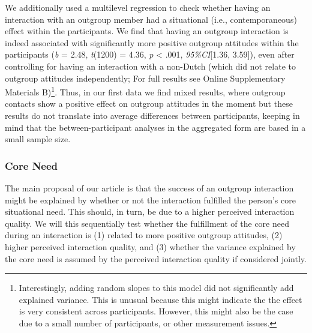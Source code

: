 We additionally used a multilevel regression to check whether having an
interaction with an outgroup member had a situational (i.e.,
contemporaneous) effect within the participants. We find that having an
outgroup interaction is indeed associated with significantly more
positive outgroup attitudes within the participants (\textit{b} = 2.48,
\textit{t}(1200) = 4.36, \textit{p} \textless{} .001,
\textit{95\%CI}{[}1.36, 3.59{]}), even after controlling for having an
interaction with a non-Dutch (which did not relate to outgroup attitudes
independently; For full results see Online Supplementary Materials
B)\footnote{Interestingly, adding random slopes to this model did not significantly add explained variance. This is unusual because this might indicate the the effect is very consistent across participants. However, this might also be the case due to a small number of participants, or other measurement issues.}.
Thus, in our first data we find mixed results, where outgroup contacts
show a positive effect on outgroup attitudes in the moment but these
results do not translate into average differences between participants,
keeping in mind that the between-participant analyses in the aggregated
form are based in a small sample size.

\subsubsection{Core Need}

The main proposal of our article is that the success of an outgroup
interaction might be explained by whether or not the interaction
fulfilled the person's core situational need. This should, in turn, be
due to a higher perceived interaction quality. We will this sequentially
test whether the fulfillment of the core need during an interaction is
(1) related to more positive outgroup attitudes, (2) higher perceived
interaction quality, and (3) whether the variance explained by the core
need is assumed by the perceived interaction quality if considered
jointly.


